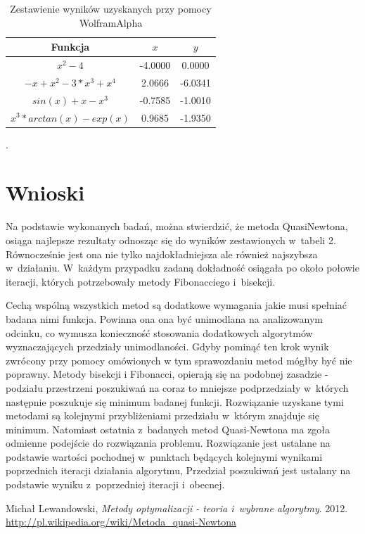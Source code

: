 \documentclass{classrep}
\begin{document}
 	\begin{table}[H]
		\begin{center}
		\begin{tabular}{|c|c|c|}
		\hline Funkcja & $x$ & $y$ \\ 
\hline $x^2 - 4$ & -4.0000 & 0.0000 \\ 
\hline $-x + x^2 - 3*x^3 + x^4$  & 2.0666 & -6.0341 \\ 
\hline $sin(x)+x-x^3$  & -0.7585 & -1.0010 \\ 
\hline $x^3*arctan(x)-exp(x)$  & 0.9685 & -1.9350 \\ 
\hline 
\end{tabular} 
				\caption{Zestawienie wyników uzyskanych przy pomocy WolframAlpha }.
		\end{center}
		\label{wolfram}
\end{table}
\section{Wnioski}
Na podstawie wykonanych badań, można stwierdzić, że metoda Quasi\-Newtona, osiąga najlepsze rezultaty odnosząc się do wyników zestawionych w~tabeli 2. Równocześnie jest ona nie tylko najdokładniejsza ale również najszybsza w~działaniu. W~każdym przypadku zadaną dokładność osiągała po około połowie iteracji, których potrzebowały metody Fibonacciego i~bisekcji.

Cechą wspólną wszystkich metod są dodatkowe wymagania jakie musi spełniać badana nimi funkcja. Powinna ona ona być unimodlana na analizowanym odcinku, co wymusza konieczność stosowania dodatkowych algorytmów wyznaczających przedziały unimodlaności. Gdyby pominąć ten krok wynik zwrócony przy pomocy omówionych w tym sprawozdaniu metod mógłby być nie poprawny. Metody bisekcji i Fibonacci, opierają się na podobnej zasadzie - podziału przestrzeni poszukiwań na coraz to mniejsze podprzedziały w~których następnie poszukuje się minimum badanej funkcji. Rozwiązanie uzyskane tymi metodami są kolejnymi przybliżeniami przedziału w~którym znajduje się minimum. Natomiast ostatnia z~badanych metod Quasi-Newtona ma zgoła odmienne podejście do rozwiązania problemu. Rozwiązanie jest ustalane na podstawie wartości pochodnej w~punktach będących kolejnymi wynikami poprzednich iteracji działania algorytmu, Przedział poszukiwań jest ustalany na podstawie wyniku z~poprzedniej iteracji i~obecnej.

\begin{thebibliography}{9}
	Michał Lewandowski,  \emph{Metody optymalizacji - teoria i~wybrane algorytmy}.  2012.
	\url{http://pl.wikipedia.org/wiki/Metoda\_quasi-Newtona}
\end{thebibliography}
\end{document}
